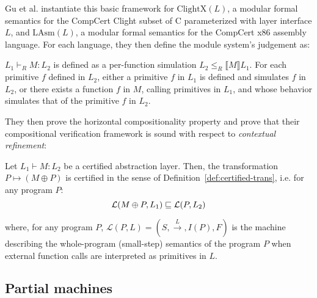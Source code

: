 {Gu et al. instantiate this basic framework for
$\text{ClightX}(L)$, a modular formal semantics for the CompCert
Clight subset of C parameterized with layer interface $L$, and
$\text{LAsm}(L)$, a modular formal semantics for the CompCert x86
assembly language. For each language, they then define
the module system's judgement as:
\begin{definition} \label{def:popl15-layers}
$L_1 \vdash_R M : L_2$ is defined as a per-function simulation
$L_2 \leqslant_R \llbracket M \rrbracket L_1$. For
  each primitive $f$ defined in $L_2$, either a primitive $f$ in $L_1$
  is defined and simulates $f$ in $L_2$, or there exists a function
  $f$ in $M$, calling primitives in $L_1$, and whose behavior
  simulates that of the primitive $f$ in $L_2$.
\end{definition}
They then prove the horizontal compositionality
property
and prove that their compositional
verification framework is sound with respect to \emph{contextual
  refinement}:

\begin{theorem}
Let $L_1 \vdash M : L_2$ be a certified abstraction layer. Then, the
transformation $P \mapsto (M \oplus P)$ is certified in the sense of
Definition~\ref{def:certified-trans}, i.e. for any program $P$:
\[ \mathcal{L}(M \oplus P, L_1) \sqsubseteq \mathcal{L}(P, L_2) \]
\end{theorem}
\noindent where, for any program 
{\small $P$, $\mathcal{L}(P, L) = (S,
\stackrel{L}{\rightarrow}, I(P), F)$} is the machine describing the
whole-program (small-step) semantics of the program $P$ when external
function calls are interpreted as primitives in $L$.

\subsection{Partial machines}}


